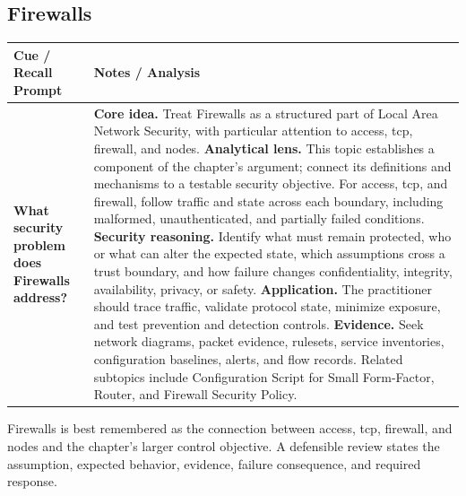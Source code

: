 \documentclass[11pt]{article}
\newcommand{\CornellHeader}{%
\rowcolor{Navy}\color{white}\bfseries Cue / Recall Prompt & \color{white}\bfseries Notes / Analysis\\\hline}
\newcommand{\CornellRow}[2]{%
\cellcolor{CueGray}\RaggedRight\textbf{#1} & \RaggedRight #2\\\hline}
\begin{document}
\subsection*{Firewalls}
\begin{longtable}{>{\RaggedRight\arraybackslash}p{}|>{\RaggedRight\arraybackslash}p{}}
\CornellHeader
\CornellRow{What security problem does Firewalls address?}{\textbf{Core idea.} Treat Firewalls as a structured part of Local Area Network Security, with particular attention to access, tcp, firewall, and nodes. \textbf{Analytical lens.} This topic establishes a component of the chapter's argument; connect its definitions and mechanisms to a testable security objective. For access, tcp, and firewall, follow traffic and state across each boundary, including malformed, unauthenticated, and partially failed conditions. \textbf{Security reasoning.} Identify what must remain protected, who or what can alter the expected state, which assumptions cross a trust boundary, and how failure changes confidentiality, integrity, availability, privacy, or safety. \textbf{Application.} The practitioner should trace traffic, validate protocol state, minimize exposure, and test prevention and detection controls. \textbf{Evidence.} Seek network diagrams, packet evidence, rulesets, service inventories, configuration baselines, alerts, and flow records. Related subtopics include Configuration Script for Small Form-Factor, Router, and Firewall Security Policy.}
\end{longtable}
\begin{topicsummary}
Firewalls is best remembered as the connection between access, tcp, firewall, and nodes and the chapter's larger control objective. A defensible review states the assumption, expected behavior, evidence, failure consequence, and required response.
\end{topicsummary}
\end{document}
